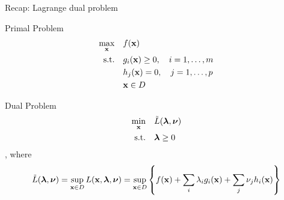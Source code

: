 \documentclass[12pt,notes,mathserif]{beamer}
\begin{document}
\begin{frame}
	{Recap: Lagrange dual problem}
	\begin{block}{Primal Problem}
		\vspace{-1em}
		\begin{equation}
			\begin{aligned}
				\max_{\mathbf{x}}   \quad    & f(\mathbf{x})         \\
				\textrm{s.t.} \quad & g_i(\mathbf{x}) \ge 0, \quad i=1,\dots,m \\
									& h_j(\mathbf{x}) =0 ,\quad j=1,\dots, p   \\
									& \mathbf{x} \in D \\ 
			\end{aligned}
		\end{equation}
	\end{block}

	\begin{block}{Dual Problem}
		\vspace{-1em}
		\begin{equation}
			\begin{aligned}
				\min_{\mathbf{x}}   \quad      & \tilde{L}( \boldsymbol{\lambda}, \boldsymbol{\nu}) \\
				\textrm{s.t.} \quad & \boldsymbol{\lambda} \ge 0             \\
			\end{aligned}
		\end{equation}
		, where
		\vspace{-1em}
		\begin{equation*}
			\tilde{L}(\boldsymbol{\lambda}, \boldsymbol{\nu} ) =  \sup_{\mathbf{x} \in D} L(\mathbf{x}, \boldsymbol{\lambda}, \boldsymbol{\nu})
			= \sup_{\mathbf{x} \in D} \left\{ f(\mathbf{x})+  \sum_i \lambda_i g_i(\mathbf{x}) + \sum_j \nu_j h_i(\mathbf{x}) \right\}
		\end{equation*}
	\end{block}
\end{frame}
\end{document}
